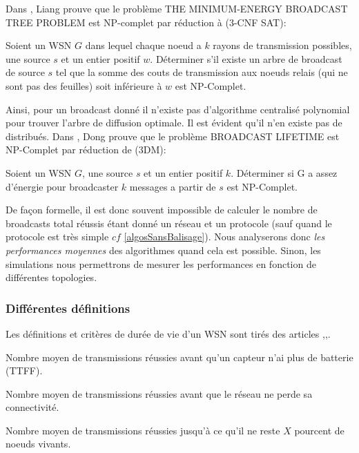 Dans \cite{Liang2002}, Liang prouve que le  problème THE MINIMUM-ENERGY BROADCAST
TREE PROBLEM est NP-complet par réduction à (3-CNF SAT):
\begin{myth}
Soient un WSN $G$ dans lequel chaque noeud a $k$ rayons de transmission possibles, une source $s$ et un entier positif $w$.
Déterminer s'il existe un arbre de broadcast de source $s$ tel que la somme des couts de transmission aux noeuds relais (qui ne sont pas des feuilles) soit inférieure à $w$ est NP-Complet.
\end{myth}
Ainsi, pour un broadcast donné il n'existe pas d'algorithme centralisé polynomial pour trouver l'arbre de diffusion optimale. Il est évident qu'il n'en existe pas de distribués. 
Dans \cite{Dong2005}, Dong prouve que le  problème BROADCAST LIFETIME est NP-Complet par réduction de (3DM):
\begin{myth}
Soient un WSN $G$, une source $s$ et un entier positif $k$.
Déterminer si G a assez d'énergie pour broadcaster $k$ messages a partir de $s$ est NP-Complet.
\end{myth}

De façon formelle, il est donc souvent impossible de calculer le nombre de broadcasts total réussis étant donné un réseau et un protocole (sauf quand le protocole est très simple $cf$ \ref{algosSansBalisage}). Nous analyserons 
donc \textit{les performances moyennes} des algorithmes quand cela est possible. Sinon, les simulations nous permettrons de mesurer les performances en fonction de différentes topologies.

\subsubsection{Différentes définitions}
Les définitions et critères de durée de vie d'un WSN sont tirés des articles \cite{Dietrich2009},\cite{Champ2009lifetime},\cite{Elleithy2011}. 

\begin{mylt}
Nombre moyen de transmissions réussies avant qu'un capteur n'ai plus de batterie (TTFF).
\end{mylt}
\begin{mylt}
Nombre moyen de transmissions réussies avant que le réseau ne perde sa connectivité.
\end{mylt}
\begin{mylt}
Nombre moyen de transmissions réussies jusqu'à ce qu'il ne reste $X$ pourcent de noeuds vivants.
\end{mylt}



